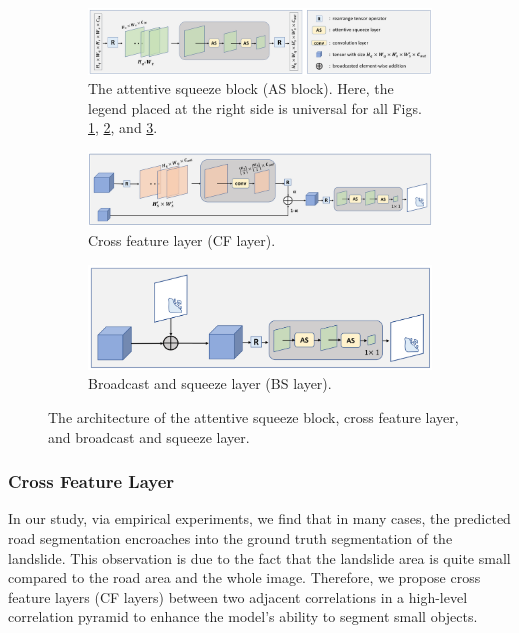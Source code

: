 \documentclass{ieeeaccess}
\begin{document}
\begin{figure}[t]
\centering
\begin{subfigure}{\textwidth}
  \centering
  \includegraphics[width=\linewidth]{Fig/ASblock_and_legend.png}  
  \caption{The attentive squeeze block (AS block). Here, the legend placed at the right side is universal for all Figs. \ref{fig:asblock}, \ref{fig:cf}, and \ref{fig:bs}.}
  \label{fig:asblock}
\end{subfigure}
\begin{subfigure}{\textwidth}
  \centering
  \includegraphics[width=\linewidth]{Fig/CFlayer_L.png}  
  \caption{Cross feature layer (CF layer).}
  \label{fig:cf}
\end{subfigure}
\begin{subfigure}{\textwidth}
  \centering
  \includegraphics[width=0.6\linewidth]{Fig/BSlayer_L.png}  
  \caption{Broadcast and squeeze layer (BS layer).}
  \label{fig:bs}
\end{subfigure}
\caption{The architecture of the attentive squeeze block, cross feature layer, and broadcast and squeeze layer.}
\label{fig:fig}
\end{figure}   

    
\subsubsection{Cross Feature Layer}
\label{CFlayer}
In our study, via empirical experiments, we find that in many cases, the predicted road segmentation encroaches into the ground truth segmentation of the landslide. This observation is due to the fact that the landslide area is quite small compared to the road area and the whole image. Therefore, we propose cross feature layers (CF layers) between two adjacent correlations in a high-level correlation pyramid to enhance the model's ability to segment small objects.
\end{document}
